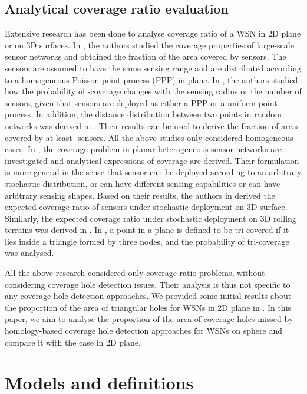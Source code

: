 \documentclass[journal, twoside]{IEEEtran}
\begin{document}
\subsection{Analytical coverage ratio evaluation} 

Extensive research has been done to analyse coverage ratio of a WSN in 2D plane or on 3D surfaces. 
In \cite{LT04}, the authors studied the coverage properties of large-scale
sensor networks and obtained the fraction of the area covered by sensors. 
The sensors are assumed to have the same sensing range and 
are distributed according to a homogeneous Poisson point process (PPP) in plane.
In \cite{WY06}, the authors studied how the 
probability of -coverage changes with the sensing radius 
or the number of sensors, given that sensors are deployed
as either a PPP or a uniform point process. 
In addition, the distance distribution between two points
in random networks was derived in \cite{M12}. Their results can be 
used to derive the fraction of areas covered by at least -sensors.
All the above studies only considered homogeneous cases. 
In \cite{LP06}, the coverage problem in planar heterogeneous sensor 
networks are investigated and analytical expressions of coverage
are derived. Their formulation is more general in the sense that
sensor can be deployed according to an arbitrary stochastic distribution,
or can have different sensing capabilities or can have arbitrary
sensing shapes. Based on their results, the authors in \cite{ZLW09}
derived the expected coverage ratio of sensors under stochastic 
deployment on 3D surface. Similarly, the expected coverage ratio 
under stochastic deployment on 3D rolling terrains was derived in 
\cite{LM12}. In \cite{LHZ12}, a point in a plane
is defined to be tri-covered if it lies inside a triangle formed
by three nodes, and the probability of tri-coverage was analysed.

All the above research considered only coverage ratio
problems, without considering coverage hole detection issues. 
Their analysis is thus not specific to any coverage hole detection
approaches. We provided some initial 
results about the proportion of the area of triangular holes for 
WSNs in 2D plane in \cite{YMD12}. In this paper, we aim to analyse the proportion of 
the area of coverage holes missed by homology-based coverage hole 
detection approaches for WSNs on sphere and compare it with the case
in 2D plane. 

\section{Models and definitions} \label{secmod}
\end{document}
